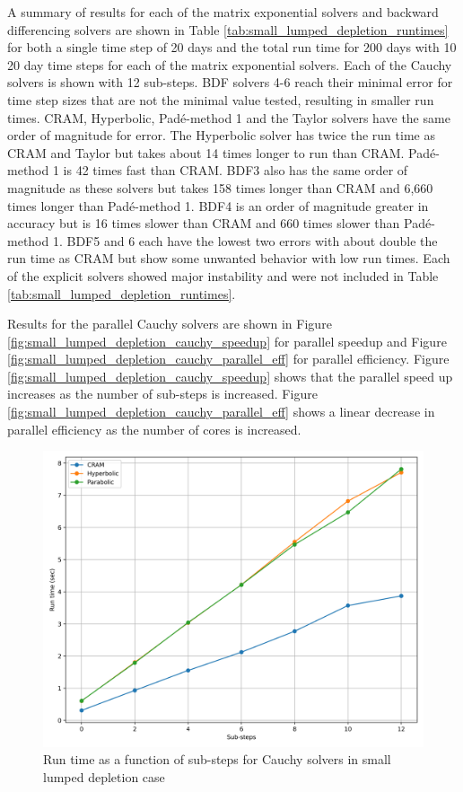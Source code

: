 A summary of results for each of the matrix exponential solvers and backward differencing solvers are shown in Table \ref{tab:small_lumped_depletion_runtimes} for both a single time step of 20 days and the total run time for 200 days with 10 20 day time steps for each of the matrix exponential solvers. Each of the Cauchy solvers is shown with 12 sub-steps. BDF solvers 4-6 reach their minimal error for time step sizes that are not the minimal value tested, resulting in smaller run times. CRAM, Hyperbolic, Pad\'e-method 1 and the Taylor solvers have the same order of magnitude for error. The Hyperbolic solver has twice the run time as CRAM and Taylor but takes about 14 times longer to run than CRAM. Pad\'e-method 1 is 42 times fast than CRAM. BDF3 also has the same order of magnitude as these solvers but takes 158 times longer than CRAM and 6,660 times longer than Pad\'e-method 1. BDF4 is an order of magnitude greater in accuracy but is 16 times slower than CRAM and 660 times slower than Pad\'e-method 1. BDF5 and 6 each have the lowest two errors with about double the run time as CRAM but show some unwanted behavior with low run times.  Each of the explicit solvers showed major instability and were not included in Table \ref{tab:small_lumped_depletion_runtimes}. 

Results for the parallel Cauchy solvers are shown in Figure \ref{fig:small_lumped_depletion_cauchy_speedup} for parallel speedup and Figure \ref{fig:small_lumped_depletion_cauchy_parallel_eff} for parallel efficiency. Figure \ref{fig:small_lumped_depletion_cauchy_speedup} shows that the parallel speed up increases as the number of sub-steps is increased. Figure \ref{fig:small_lumped_depletion_cauchy_parallel_eff} shows a linear decrease in parallel efficiency as the number of cores is increased. 


\clearpage

\begin{figure}[p]
    \centering
    \includegraphics[width=5in]{images/chapter-5/caseStudies/smallLumpedDepletion/msrLumpedDepletionSmallCauchyRuntimes.png}
    \caption{Run time as a function of sub-steps for Cauchy solvers in small lumped depletion case}
    \label{fig:small_lumped_depletion_Cauchy_runtimes}
\end{figure}

